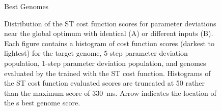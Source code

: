  \begin{figure}[thb!]
 \caption{Best Genomes}
     \label{fig:GA:8}
 \end{figure}

  \begin{figure}[htb]
    \centering
    \caption{Distribution of the ST cost function scores for parameter
      deviations near the global optimum with identical (A) or
      different {\ANF} inputs (B). Each figure contains a histogram of
      cost function scores (darkest to lightest) for the target
      genome, 5-step parameter deviation population, 1-step parameter
      deviation population, and genomes evaluated by the {\GA} trained
      with the ST cost function.  Histograms of the ST cost function
      evaluated {\GA} scores are truncated at 50 rather than the maximum
      score of 330~ms.  Arrow indicates the location of the {\GA}s best
      genome score.}
    \label{fig:GA:9}
  \end{figure}



